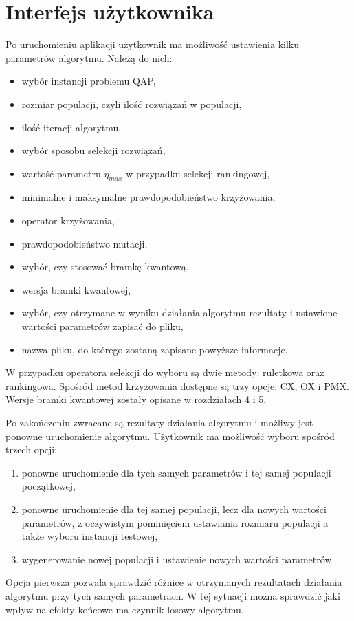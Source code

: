 \section{Interfejs użytkownika}
Po uruchomieniu aplikacji użytkownik ma możliwość ustawienia kilku parametrów algorytmu. Należą do nich:
\begin{itemize}
\item wybór instancji problemu QAP,
\item rozmiar populacji, czyli ilość rozwiązań w populacji,
\item ilość iteracji algorytmu,
\item wybór sposobu selekcji rozwiązań,
\item wartość parametru $\eta_{max}$ w przypadku selekcji rankingowej,
\item minimalne i maksymalne prawdopodobieństwo krzyżowania,
\item operator krzyżowania,
\item prawdopodobieństwo mutacji,
\item wybór, czy stosować bramkę kwantową,
\item wersja bramki kwantowej,
\item wybór, czy otrzymane w wyniku działania algorytmu rezultaty i ustawione wartości parametrów zapisać do pliku,
\item nazwa pliku, do którego zostaną zapisane powyższe informacje.
\end{itemize}

W przypadku operatora selekcji do wyboru są dwie metody: ruletkowa oraz rankingowa. Spośród metod krzyżowania dostępne są trzy opcje: CX, OX i PMX. Wersje bramki kwantowej zostały opisane w rozdziałach 4 i 5.

Po zakończeniu zwracane są rezultaty działania algorytmu i możliwy jest ponowne uruchomienie algorytmu. Użytkownik ma możliwość wyboru spośród trzech opcji:
\begin{enumerate}
\item ponowne uruchomienie dla tych samych parametrów i tej samej populacji początkowej,
\item ponowne uruchomienie dla tej samej populacji, lecz dla nowych wartości parametrów, z oczywistym pominięciem ustawiania rozmiaru populacji a także wyboru instancji testowej,
\item wygenerowanie nowej populacji i ustawienie nowych wartości parametrów.
\end{enumerate}

Opcja pierwsza pozwala sprawdzić różnice w otrzymanych rezultatach działania algorytmu przy tych samych parametrach. W tej sytuacji można sprawdzić jaki wpływ na efekty końcowe ma czynnik losowy algorytmu.


